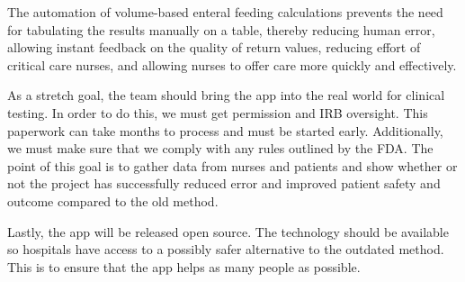 \documentclass[fullpage,10pt, onecolumn, draftclsnofoot]{IEEEtran}
\begin{document}
The automation of volume-based enteral feeding calculations prevents the need for tabulating
the results manually on a table, thereby reducing human error, allowing instant feedback on
the quality of return values, reducing effort of critical care nurses, and allowing nurses to offer
care more quickly and effectively.

As a stretch goal, the team should bring the app into the real world for clinical testing. 
In order to do this, we must get permission and IRB oversight. This paperwork can take months to 
process and must be started early. Additionally, we must make sure that we comply with any rules
outlined by the FDA. The point of this goal is to gather data from nurses and patients and show 
whether or not the project has successfully reduced error and improved patient safety and outcome 
compared to the old method. 

Lastly, the app will be released open source. The technology should be available so hospitals
have access to a possibly safer alternative to the outdated method. This is to ensure that the app
helps as many people as possible. 
 
\end{document}

